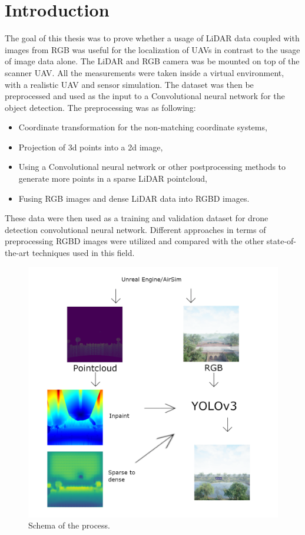 \documentclass[twoside]{ctuthesis}
\theoremstyle{plain}
\theoremstyle{definition}
\theoremstyle{note}
\begin{document}
\maketitle
\chapter{Introduction}
The goal of this thesis was to prove whether a usage of LiDAR data coupled with images from RGB was useful for the localization of UAVs in contrast to the usage of image data alone. The LiDAR and RGB camera was be mounted on top of the scanner UAV. All the measurements were taken inside a virtual environment, with a realistic UAV and sensor simulation. The dataset was then be preprocessed and used as the input to a Convolutional neural network for the object detection. The preprocessing was as following:
\begin{itemize}
	\item Coordinate transformation for the non-matching coordinate systems,
	\item Projection of 3d points into a 2d image,
	\item Using a Convolutional neural network or other postprocessing methods to generate more points in a sparse LiDAR pointcloud,
	\item Fusing RGB images and dense LiDAR data into RGBD images.
\end{itemize}
These data were then used as a training and validation dataset for drone detection convolutional neural network. Different approaches in terms of preprocessing RGBD images were utilized and compared with the other state-of-the-art techniques used in this field.
\begin{figure}[h]
	\centering
	\includegraphics[width=\textwidth]{intro_schema.png}
	\caption{Schema of the process.}
\end{figure}
\pagebreak
\end{document}
